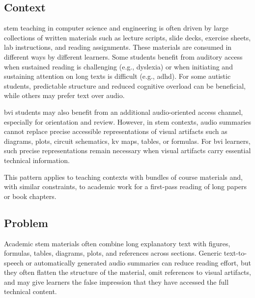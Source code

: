 \patternSeven

\subsection*{Context}

\ac{stem} teaching in computer science and engineering is often driven by large collections of written materials such as lecture scripts, slide decks, exercise sheets, lab instructions, and reading assignments. These materials are consumed in different ways by different learners. Some students benefit from auditory access when sustained reading is challenging (e.g., dyslexia) or when initiating and sustaining attention on long texts is difficult (e.g., \ac{adhd}). For some autistic students, predictable structure and reduced cognitive overload can be beneficial, while others may prefer text over audio.

\ac{bvi} students may also benefit from an additional audio-oriented access channel, especially for orientation and review. However, in \ac{stem} contexts, audio summaries cannot replace precise accessible representations of visual artifacts such as diagrams, plots, circuit schematics, \ac{kv} maps, tables, or formulas. For \ac{bvi} learners, such precise representations remain necessary when visual artifacts carry essential technical information.

This pattern applies to teaching contexts with bundles of course materials and, with similar constraints, to academic work for a first-pass reading of long papers or book chapters.

\subsection*{Problem}

Academic \ac{stem} materials often combine long explanatory text with figures, formulas, tables, diagrams, plots, and references across sections. Generic text-to-speech or automatically generated audio summaries can reduce reading effort, but they often flatten the structure of the material, omit references to visual artifacts, and may give learners the false impression that they have accessed the full technical content.


